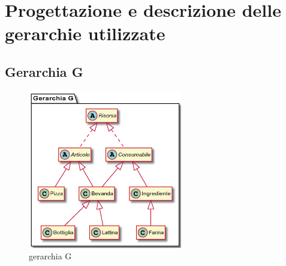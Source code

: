 \documentclass[
  10pt,
]{article}
\begin{document}
\hypertarget{progettazione-e-descrizione-delle-gerarchie-utilizzate}{%
\section{Progettazione e descrizione delle gerarchie
utilizzate}\label{progettazione-e-descrizione-delle-gerarchie-utilizzate}}

\hypertarget{gerarchia-g}{%
\subsection{Gerarchia G}\label{gerarchia-g}}

\begin{figure}
\centering
\includegraphics[width=0.6\textwidth,height=\textheight]{./gerarchiaG.png}
\caption{gerarchia G}
\end{figure}
\end{document}
